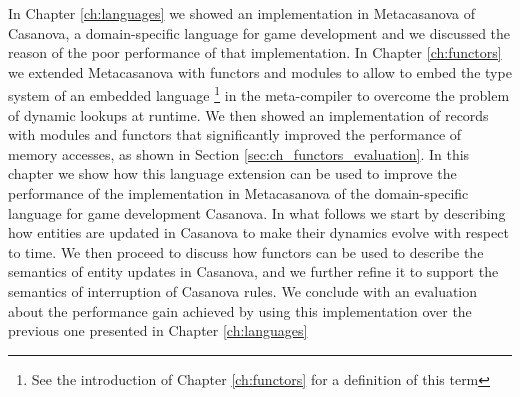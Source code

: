 In Chapter \ref{ch:languages} we showed an implementation in Metacasanova of Casanova, a domain-specific language for game development and we discussed the reason of the poor performance of that implementation. In Chapter \ref{ch:functors} we extended Metacasanova with functors and modules to allow to embed the type system of an embedded  language \footnote{See the introduction of Chapter \ref{ch:functors} for a definition of this term} in the meta-compiler to overcome the problem of dynamic lookups at runtime. We then showed an implementation of records with modules and functors that significantly improved the performance of memory accesses, as shown in Section \ref{sec:ch_functors_evaluation}. In this chapter we show how this language extension can be used to improve the performance of the implementation in Metacasanova of the domain-specific language for game development Casanova. In what follows we start by describing how entities are updated in Casanova to make their dynamics evolve with respect to time. We then proceed to discuss how functors can be used to describe the semantics of entity updates in Casanova, and we further refine it to support the semantics of interruption of Casanova rules. We conclude with an evaluation about the performance gain achieved by using this implementation over the previous one presented in Chapter \ref{ch:languages}


